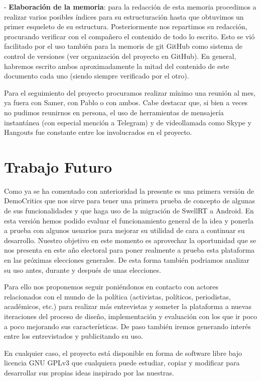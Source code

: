 - \textbf{Elaboración de la memoria}: para la redacción de esta memoria procedimos a realizar varios posibles índices para su estructuración hasta que obtuvimos un primer esqueleto de su estructura. Posteriormente nos repartimos su redacción, procurando verificar con el compañero el contenido de todo lo escrito. Esto se vió facilitado por el uso también para la memoris de git  GitHub como sistema de control de versiones (ver organización del proyecto en GitHub). En general, habremos escrito ambos aproximadamente la mitad del contenido de este documento cada uno (siendo siempre verificado por el otro).

Para el seguimiento del proyecto procuramos realizar mínimo una reunión al mes, ya fuera con Samer, con Pablo o con ambos. Cabe destacar que, si bien a veces no pudimos reunirnos en persona, el uso de herramientas de mensajería instantánea (con especial mención a Telegram) y de videollamada como Skype y Hangouts fue constante entre los involucrados en el proyecto.

\section{Trabajo Futuro}

Como ya se ha comentado con anterioridad la presente es una primera versión de DemoCritics que nos sirve para tener una primera prueba de concepto de algunas de sus funcionalidades y que haga uso de la migración de SwellRT a Android. En esta versión hemos podido evaluar el funcionamiento general de la idea y ponerla a prueba con algunos usuarios para mejorar su utilidad de cara a continuar su desarrollo. Nuestro objetivo en este momento es aprovechar la oportunidad que se nos presenta en este año electoral para poner realmente a prueba esta plataforma en las próximas elecciones generales. De esta forma también podriamos analizar su uso antes, durante y después de unas elecciones.

Para ello nos proponemos seguir poniéndonos en contacto con actores relacionados con el mundo de la política (activistas, políticos, periodistas, académicos, etc.) para realizar más entrevistas y someter la plataforma a nuevas iteraciones del proceso de diseño, implementación y evaluación con los que ir poco a poco mejorando sus características. De paso también iremos generando interés entre los entrevistados y publicitando su uso.

En cualquier caso, el proyecto está disponible en forma de software libre bajo licencia GNU GPLv3 que cualquiera puede estudiar, copiar y modificar para desarrollar sus propias ideas inspirado por las nuestras. 


